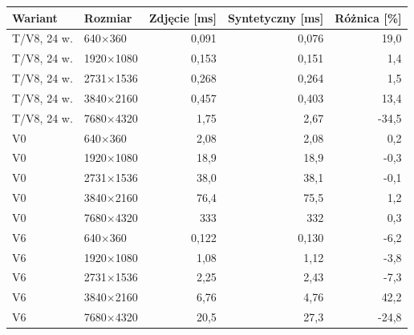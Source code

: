 \begin{tabular}{llrrr}
\toprule
Wariant & Rozmiar & Zdjęcie [ms] & Syntetyczny [ms] & Różnica [\%] \\
\midrule
T/V8, 24 w. & 640$\times$360 & 0,091 & 0,076 & 19,0 \\
T/V8, 24 w. & 1920$\times$1080 & 0,153 & 0,151 & 1,4 \\
T/V8, 24 w. & 2731$\times$1536 & 0,268 & 0,264 & 1,5 \\
T/V8, 24 w. & 3840$\times$2160 & 0,457 & 0,403 & 13,4 \\
T/V8, 24 w. & 7680$\times$4320 & 1,75 & 2,67 & -34,5 \\
V0 & 640$\times$360 & 2,08 & 2,08 & 0,2 \\
V0 & 1920$\times$1080 & 18,9 & 18,9 & -0,3 \\
V0 & 2731$\times$1536 & 38,0 & 38,1 & -0,1 \\
V0 & 3840$\times$2160 & 76,4 & 75,5 & 1,2 \\
V0 & 7680$\times$4320 & 333 & 332 & 0,3 \\
V6 & 640$\times$360 & 0,122 & 0,130 & -6,2 \\
V6 & 1920$\times$1080 & 1,08 & 1,12 & -3,8 \\
V6 & 2731$\times$1536 & 2,25 & 2,43 & -7,3 \\
V6 & 3840$\times$2160 & 6,76 & 4,76 & 42,2 \\
V6 & 7680$\times$4320 & 20,5 & 27,3 & -24,8 \\
\bottomrule
\end{tabular}
